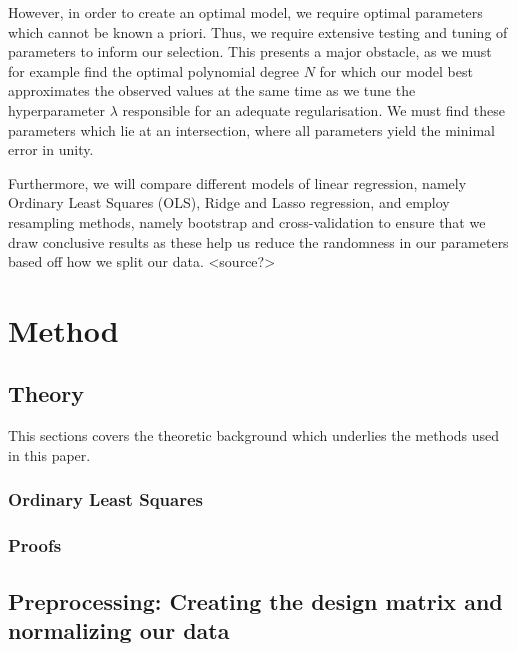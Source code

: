 \documentclass[twocolumn,10pt]{asme2ej}
\begin{document}
However, in order to create an optimal model, we require optimal parameters which cannot be known a priori. Thus, we require extensive testing and tuning of parameters to inform our selection. This presents a major obstacle, as we must for example find the optimal polynomial degree $N$ for which our model best approximates the observed values at the same time as we tune the hyperparameter $\lambda$ responsible for an adequate regularisation. We must find these parameters which lie at an intersection, where all parameters yield the minimal error in unity.

Furthermore, we will compare different models of linear regression, namely Ordinary Least Squares (OLS), Ridge and Lasso regression, and employ resampling methods, namely bootstrap and cross-validation to ensure that we draw conclusive results as these help us reduce the randomness in our parameters based off how we split our data. <source?>




\section{Method}

\subsection{Theory}

This sections covers the theoretic background which underlies the methods used in this paper.

\subsubsection{Ordinary Least Squares}

\subsubsection{Proofs}

\subsection{Preprocessing: Creating the design matrix and normalizing our data}
\end{document}
